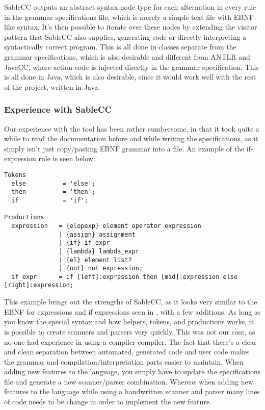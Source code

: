 SableCC outputs an abstract syntax node type for each alternation
in every rule in the grammar specifications file, which is merely a
simple text file with EBNF-like syntax. It's then possible to iterate
over these nodes by extending the visitor pattern that SableCC also
supplies, generating code or directly interpreting a syntactically
correct program. This is all done in classes separate from the grammar
specifications, which is also desirable and different from ANTLR
and JavaCC, where action code is injected directly in the grammar
specification. This is all done in Java, which is also desirable, since
it would work well with the rest of the project, written in Java.

\subsubsection{Experience with SableCC}
Our experience with the tool has been rather cumbersome, in that it took
quite a while to read the documentation before and while writing the
specifications, as it simply isn't just copy/pasting EBNF grammar
into a file. An example of the if-expression rule is seen below:

\begin{lstlisting}[caption={Part of the grammar specifications file of SableCC, with focus on if expressions.}]
Tokens
  else          = 'else';
  then          = 'then';
  if            = 'if';

Productions
  expression   = {elopexp} element operator expression
               | {assign} assignment
               | {if} if_expr
               | {lambda} lambda_expr
               | {el} element list?
               | {not} not expression;
  if_expr      = if [left]:expression then [mid]:expression else [right]:expression;
\end{lstlisting}

This example brings out the strengths of SableCC, as it looks very
similar to the EBNF for expressions and if expressions seen in
, with a few additions. As long as you know
the special syntax and how helpers, tokens, and productions works, it
is possible to create scanners and parsers very quickly. This was not
our case, as no one had experience in using a compiler-compiler. 
The fact that there's a clear and clean separation between automated, generated code
and user code makes the grammar and compilation/interpretation parts
easier to maintain. When adding new features to the language, you simply
have to update the specifications file and generate a new scanner/parser
combination. Whereas when adding new features to the language
while using a handwritten scanner and parser many lines of code needs
to be change in order to implement the new feature.

